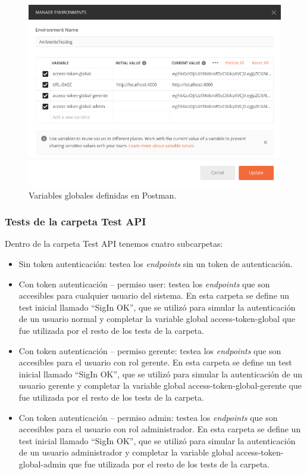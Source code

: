 \begin{figure}[ht]
	\centering
	\includegraphics[width=1\textwidth]{./Figures/PostmanEnvironmnet.png}
	\caption{Variables globales definidas en Postman.}
	\label{fig:PostmanEnvironmnet}
\end{figure}

\subsubsection{Tests de la carpeta Test API }

Dentro de la carpeta Test API tenemos cuatro subcarpetas:

\begin{itemize}
\item Sin token autenticación: testea los \textit{endpoints} sin un token de autenticación.
\item Con token autenticación – permiso user: testea los \textit{endpoints}  que son accesibles para cualquier usuario del sistema. En esta carpeta se define un test inicial llamado ``SigIn OK'', que se utilizó para simular la autenticación de un usuario normal y completar la variable global access-token-global que fue utilizada por el resto de los tests de la carpeta.
\item Con token autenticación – permiso gerente: testea los \textit{endpoints}  que son accesibles para el usuario con rol gerente. En esta carpeta se define un test inicial llamado ``SigIn OK'', que se utilizó para simular la autenticación de un usuario gerente y completar la variable global access-token-global-gerente que fue utilizada por el resto de los tests de la carpeta.
\item Con token autenticación – permiso admin: testea los \textit{endpoints} que son accesibles para el usuario con rol administrador. En esta carpeta se define un test inicial llamado ``SigIn OK'', que se utilizó para simular la autenticación de un usuario administrador y completar la variable global access-token-global-admin que fue utilizada por el resto de los tests de la carpeta.
\end{itemize}

